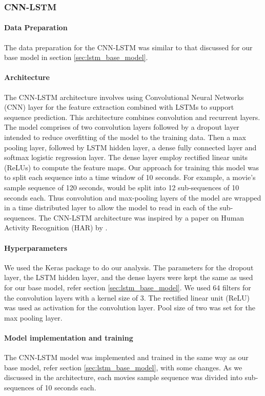 \subsubsection{CNN-LSTM}
\paragraph{Data Preparation} The data preparation for the CNN-LSTM was similar to that discussed for our base model in section \ref{sec:lstm_base_model}.

\paragraph{Architecture} The CNN-LSTM architecture involves using Convolutional Neural Networks (CNN) layer for the feature extraction combined with LSTMs to support sequence prediction. This architecture combines convolution and recurrent layers. The model comprises of two convolution layers followed by a dropout layer intended to reduce overfitting of the model to the training data. Then a max pooling layer, followed by LSTM hidden layer, a dense fully connected layer and softmax logistic regression layer. The dense layer employ rectified linear units (ReLUs) to compute the feature maps. Our approach for training this model was to split each sequence into a time window of 10 seconds. For example, a movie's sample sequence of 120 seconds, would be split into 12 sub-sequences of 10 seconds each. Thus convolution and max-pooling layers of the model are wrapped in a time distributed layer to allow the model to read in each of the sub-sequences. The CNN-LSTM architecture was inspired by a paper on Human Activity Recognition (HAR) by \citeauthor{ordonez_deep_2016} \cite{ordonez_deep_2016}. 

\paragraph{Hyperparameters} We used the Keras \cite{keras} package to do our analysis. The parameters for the dropout layer, the LSTM hidden layer, and the dense layers were kept the same as used for our base model, refer section \ref{sec:lstm_base_model}. We used 64 filters for the convolution layers with a kernel size of 3. The rectified linear unit (ReLU) was used as activation for the convolution layer. Pool size of two was set for the max pooling layer.

\paragraph{Model implementation and training} The CNN-LSTM model was implemented and trained in the same way as our base model, refer section \ref{sec:lstm_base_model}, with some changes. As we discussed in the architecture, each movies sample sequence was divided into sub-sequences of 10 seconds each.

